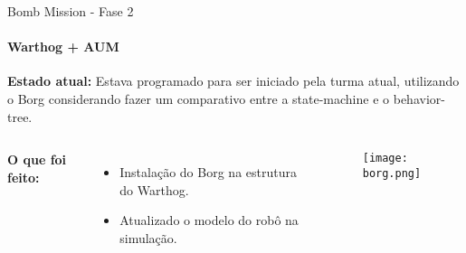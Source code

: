 \begin{frame}[t]{Bomb Mission - Fase 2} 
    \framesubtitle{Warthog + AUM}

    \textbf{Estado atual:} Estava programado para ser iniciado pela turma atual, utilizando o Borg considerando fazer um comparativo entre a state-machine e o behavior-tree.

    \vspace*{0.3cm}
        \begin{columns}[t]

            \textbf{O que foi feito:}
            \begin{itemize}
                \item Instalação do Borg na estrutura do Warthog.
                \item Atualizado o modelo do robô na simulação.
            \end{itemize}
            \begin{center}
                \begin{figure}
                    \texttt{[image: borg.png]}
                \end{figure}
            \end{center}
        \end{columns}
\end{frame}
